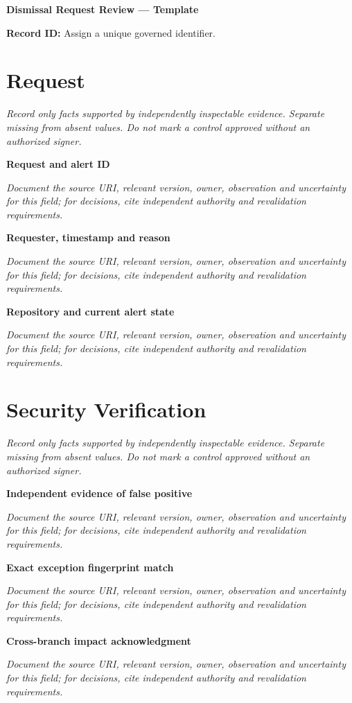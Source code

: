 \documentclass[11pt,letterpaper]{article}
\begin{document}
\begin{center}{\LARGE\bfseries Dismissal Request Review --- Template}\par
\vspace{4pt}{\small Guided authoring instrument (not a completed assessment)}\par
\end{center}
\noindent\textbf{Record ID:} Assign a unique governed identifier.\par
\section{Request}
\noindent\emph{Record only facts supported by independently inspectable evidence. Separate missing from absent values. Do not mark a control approved without an authorized signer.}\par
\noindent\textbf{Request and alert ID}\par
\noindent\emph{Document the source URI, relevant version, owner, observation and uncertainty for this field; for decisions, cite independent authority and revalidation requirements.}\par\medskip
\noindent\textbf{Requester, timestamp and reason}\par
\noindent\emph{Document the source URI, relevant version, owner, observation and uncertainty for this field; for decisions, cite independent authority and revalidation requirements.}\par\medskip
\noindent\textbf{Repository and current alert state}\par
\noindent\emph{Document the source URI, relevant version, owner, observation and uncertainty for this field; for decisions, cite independent authority and revalidation requirements.}\par\medskip
\section{Security Verification}
\noindent\emph{Record only facts supported by independently inspectable evidence. Separate missing from absent values. Do not mark a control approved without an authorized signer.}\par
\noindent\textbf{Independent evidence of false positive}\par
\noindent\emph{Document the source URI, relevant version, owner, observation and uncertainty for this field; for decisions, cite independent authority and revalidation requirements.}\par\medskip
\noindent\textbf{Exact exception fingerprint match}\par
\noindent\emph{Document the source URI, relevant version, owner, observation and uncertainty for this field; for decisions, cite independent authority and revalidation requirements.}\par\medskip
\noindent\textbf{Cross-branch impact acknowledgment}\par
\noindent\emph{Document the source URI, relevant version, owner, observation and uncertainty for this field; for decisions, cite independent authority and revalidation requirements.}\par\medskip
\end{document}
